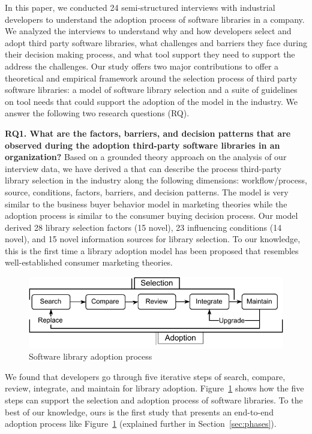 \documentclass[manuscript,review,screen, table]{acmart}
\def\bf{\textbf}
\def\fig {Figure~}
\def\sec {Section~}
\newcommand{\nd}{\vspace{1mm}\noindent}
\begin{document}
In this paper, we conducted 24 semi-structured interviews with industrial developers to understand the adoption process of software libraries in a company. We analyzed the interviews to understand why and how developers select and adopt third party software libraries, what challenges and barriers they face during their decision making process, and what tool support they need to support the address the challenges. Our study offers two major contributions to offer a theoretical and empirical framework around the selection process of third party software libraries: a model of software library selection and a suite of guidelines on tool needs that could support the adoption of the model in the industry. We answer the following two research questions (RQ).


\nd\bf{{RQ1. What are the factors, barriers, and decision patterns that are observed during the adoption third-party software libraries in an organization?}} Based on a grounded theory approach on the analysis of our interview data, we have derived a \model\space that can describe the process third-party library selection in the industry along the following dimensions: workflow/process, source, conditions, factors, barriers, and decision patterns. The model is very similar to the business buyer behavior model in marketing theories \cite{kotler2014principles} while the adoption process is similar to the consumer buying decision process. Our model derived 28 library selection factors (15 novel), 23 influencing conditions (14 novel), and 15 novel information sources for library selection. To our knowledge, this is the first time a library adoption model has been proposed that resembles well-established consumer marketing theories.
\begin{figure}[h]
    \centering
    \includegraphics[scale=.7]{images/adoption-process.pdf}
    \caption{Software library adoption process}
    \label{fig:adoption-process}
\end{figure}
We found that developers go through five iterative steps of search, compare, review, integrate, and maintain for library adoption. \fig\ref{fig:adoption-process} shows how the five steps can support the selection and adoption process of software libraries. To the best of our knowledge, ours is the first study that presents an end-to-end adoption process like \fig\ref{fig:adoption-process} (explained further in \sec\ref{sec:phases}).
\end{document}
